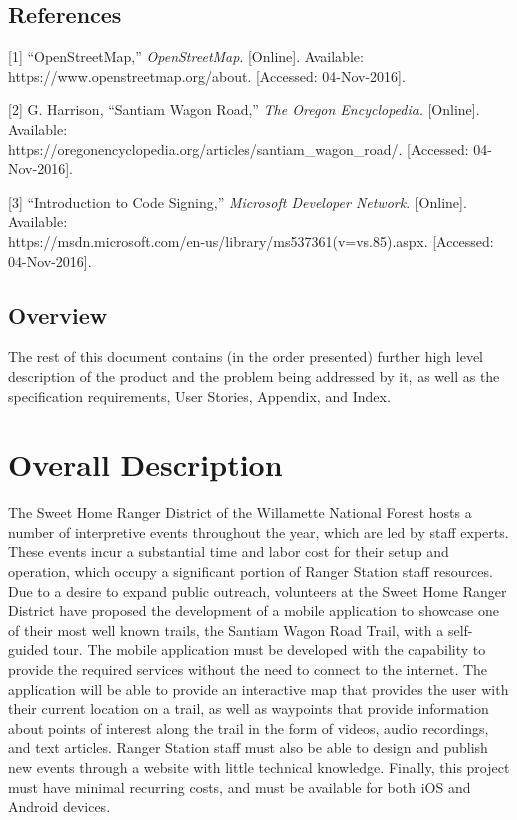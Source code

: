 \documentclass[letterpaper, 10pt,titlepage]{article}
\begin{document}
\subsection{References}

[1] “OpenStreetMap,” \textit{OpenStreetMap}. [Online]. Available: https://www.openstreetmap.org/about. [Accessed: 04-Nov-2016]. \par


[2] G. Harrison, “Santiam Wagon Road,” \textit{The Oregon Encyclopedia}. [Online]. Available: \\ https://oregonencyclopedia.org/articles/santiam\_wagon\_road/. [Accessed: 04-Nov-2016]. \par


[3] “Introduction to Code Signing,” \textit{Microsoft Developer Network}. [Online]. Available: \\ https://msdn.microsoft.com/en-us/library/ms537361(v=vs.85).aspx. [Accessed: 04-Nov-2016]. 



\vspace{0.3cm}

\subsection{Overview}
The rest of this document contains (in the order presented) further high level description of the product and the problem being addressed by it, as well as the specification requirements, User Stories, Appendix, and Index. 



\section{Overall Description}
The Sweet Home Ranger District of the Willamette National Forest hosts a number of interpretive events throughout the year, which are led by staff experts. These events incur a substantial time and labor  cost for their setup and operation, which occupy a significant portion of Ranger Station staff resources.  Due to a desire to expand public outreach, volunteers at the Sweet Home Ranger District have proposed the development of a mobile application to showcase one of their most well known trails, the Santiam Wagon Road Trail, with a self-guided tour. The mobile application must be developed with the capability to provide the required services without the need to connect to the internet. The application will be able to provide an interactive map that provides the user with their current location on a trail, as well as waypoints that provide information about points of interest along the trail in the form of videos, audio recordings, and text articles. Ranger Station staff must also be able to design and publish new events through a website with little technical knowledge. Finally, this project must have minimal recurring costs, and must be available for both iOS and Android devices.
\end{document}
